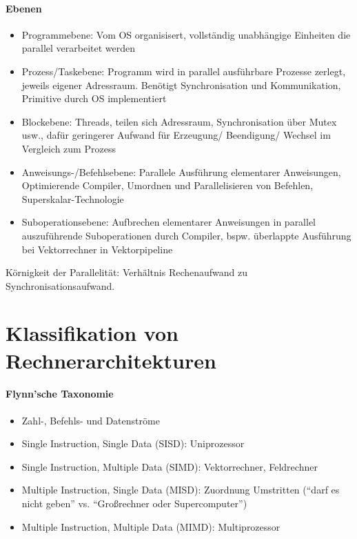 	\paragraph{Ebenen}
		\begin{itemize}
			\item Programmebene: Vom OS organisisert, vollständig unabhängige Einheiten die parallel verarbeitet werden
			\item Prozess/Taskebene: Programm wird in parallel ausführbare Prozesse zerlegt, jeweils eigener Adressraum. Benötigt Synchronisation und Kommunikation, Primitive durch OS implementiert
			\item Blockebene: Threads, teilen sich Adressraum, Synchronisation über Mutex usw., dafür geringerer Aufwand für Erzeugung/ Beendigung/ Wechsel im Vergleich zum Prozess
			\item Anweisungs-/Befehlsebene: Parallele Ausführung elementarer Anweisungen, Optimierende Compiler, Umordnen und Parallelisieren von Befehlen, Superskalar-Technologie
			\item Suboperationsebene: Aufbrechen elementarer Anweisungen in parallel auszuführende Suboperationen durch Compiler, bspw. überlappte Ausführung bei Vektorrechner in Vektorpipeline
		\end{itemize}
		Körnigkeit der Parallelität: Verhältnis Rechenaufwand zu Synchronisationsaufwand.

\section{Klassifikation von Rechnerarchitekturen}
	\paragraph{Flynn'sche Taxonomie} 
		\begin{itemize}
			\item Zahl-, Befehls- und Datenströme
			\item Single Instruction, Single Data (SISD): Uniprozessor
			\item Single Instruction, Multiple Data (SIMD): Vektorrechner, Feldrechner
			\item Multiple Instruction, Single Data (MISD): Zuordnung Umstritten ("`darf es nicht geben"' vs. "`Großrechner oder Supercomputer"')
			\item Multiple Instruction, Multiple Data (MIMD): Multiprozessor
		\end{itemize}